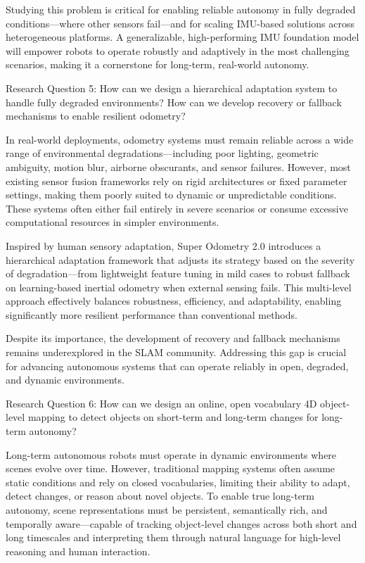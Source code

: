 Studying this problem is critical for enabling reliable autonomy in fully degraded conditions—where other sensors fail—and for scaling IMU-based solutions across heterogeneous platforms. A generalizable, high-performing IMU foundation model will empower robots to operate robustly and adaptively in the most challenging scenarios, making it a cornerstone for long-term, real-world autonomy.

\begin{framed} Research Question 5: How can we design a hierarchical adaptation system to handle fully degraded environments? How can we develop recovery or fallback mechanisms to enable resilient odometry? \end{framed}

In real-world deployments, odometry systems must remain reliable across a wide range of environmental degradations—including poor lighting, geometric ambiguity, motion blur, airborne obscurants, and sensor failures. However, most existing sensor fusion frameworks rely on rigid architectures or fixed parameter settings, making them poorly suited to dynamic or unpredictable conditions. These systems often either fail entirely in severe scenarios or consume excessive computational resources in simpler environments.

Inspired by human sensory adaptation, Super Odometry 2.0 introduces a hierarchical adaptation framework that adjusts its strategy based on the severity of degradation—from lightweight feature tuning in mild cases to robust fallback on learning-based inertial odometry when external sensing fails. This multi-level approach effectively balances robustness, efficiency, and adaptability, enabling significantly more resilient performance than conventional methods.

Despite its importance, the development of recovery and fallback mechanisms remains underexplored in the SLAM community. Addressing this gap is crucial for advancing autonomous systems that can operate reliably in open, degraded, and dynamic environments.


\begin{framed} Research Question 6: How can we design an online, open vocabulary 4D object-level mapping to detect objects on short-term and long-term changes for long-term autonomy? 
\end{framed}

Long-term autonomous robots must operate in dynamic environments where scenes evolve over time. However, traditional mapping systems often assume static conditions and rely on closed vocabularies, limiting their ability to adapt, detect changes, or reason about novel objects. To enable true long-term autonomy, scene representations must be persistent, semantically rich, and temporally aware—capable of tracking object-level changes across both short and long timescales and interpreting them through natural language for high-level reasoning and human interaction.

